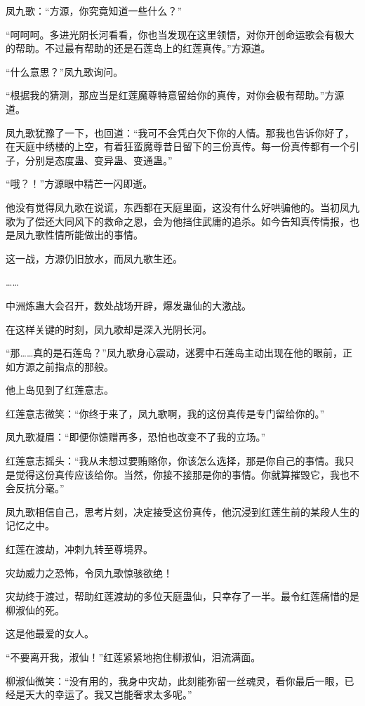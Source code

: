 \begin{this_body}
凤九歌：“方源，你究竟知道一些什么？”

“呵呵呵。多进光阴长河看看，你也当发现在这里领悟，对你开创命运歌会有极大的帮助。不过最有帮助的还是石莲岛上的红莲真传。”方源道。

“什么意思？”凤九歌询问。

“根据我的猜测，那应当是红莲魔尊特意留给你的真传，对你会极有帮助。”方源道。

凤九歌犹豫了一下，也回道：“我可不会凭白欠下你的人情。那我也告诉你好了，在天庭中绣楼的上空，有着狂蛮魔尊昔日留下的三份真传。每一份真传都有一个引子，分别是态度蛊、变异蛊、变通蛊。”

“哦？！”方源眼中精芒一闪即逝。

他没有觉得凤九歌在说谎，东西都在天庭里面，这没有什么好哄骗他的。当初凤九歌为了偿还大同风下的救命之恩，会为他挡住武庸的追杀。如今告知真传情报，也是凤九歌性情所能做出的事情。

这一战，方源仍旧放水，而凤九歌生还。

……

中洲炼蛊大会召开，数处战场开辟，爆发蛊仙的大激战。

在这样关键的时刻，凤九歌却是深入光阴长河。

“那……真的是石莲岛？”凤九歌身心震动，迷雾中石莲岛主动出现在他的眼前，正如方源之前指点的那般。

他上岛见到了红莲意志。

红莲意志微笑：“你终于来了，凤九歌啊，我的这份真传是专门留给你的。”

凤九歌凝眉：“即便你馈赠再多，恐怕也改变不了我的立场。”

红莲意志摇头：“我从未想过要贿赂你，你该怎么选择，那是你自己的事情。我只是觉得这份真传应该给你。当然，你接不接那是你的事情。你就算摧毁它，我也不会反抗分毫。”

凤九歌相信自己，思考片刻，决定接受这份真传，他沉浸到红莲生前的某段人生的记忆之中。

红莲在渡劫，冲刺九转至尊境界。

灾劫威力之恐怖，令凤九歌惊骇欲绝！

灾劫终于渡过，帮助红莲渡劫的多位天庭蛊仙，只幸存了一半。最令红莲痛惜的是柳淑仙的死。

这是他最爱的女人。

“不要离开我，淑仙！”红莲紧紧地抱住柳淑仙，泪流满面。

柳淑仙微笑：“没有用的，我身中灾劫，此刻能弥留一丝魂灵，看你最后一眼，已经是天大的幸运了。我又岂能奢求太多呢。”


\end{this_body}
